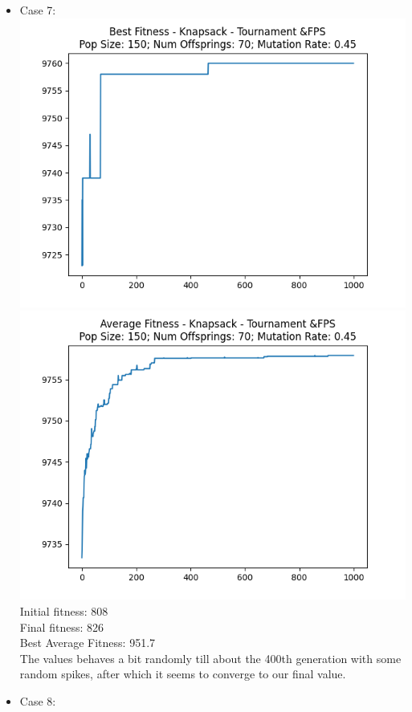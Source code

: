 \documentclass[12pt]{report} %
\begin{document}
\begin{itemize}
	\item Case 7:\\
	      \includegraphics[scale=0.5]{../Analysis/BSF_Knapsack_2_0_150_70.png}
	      \includegraphics[scale=0.5]{../Analysis/ASF_Knapsack_2_0_150_70.png}
	      \\Initial fitness:  808
	      \\Final fitness:  826
	      \\Best Average Fitness: 951.7
	      \\The values behaves a bit randomly till about the 400th generation with some random spikes, after which it seems to converge to our final value.
	\item Case 8:\\

\end{itemize}
\end{document}
